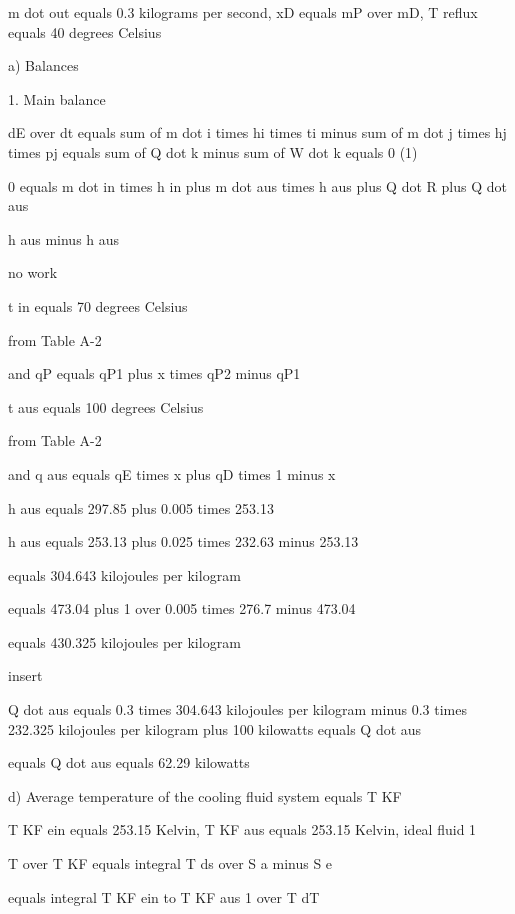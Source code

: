 m dot out equals 0.3 kilograms per second, xD equals mP over mD, T reflux equals 40 degrees Celsius

a) Balances

1. Main balance

dE over dt equals sum of m dot i times hi times ti minus sum of m dot j times hj times pj equals sum of Q dot k minus sum of W dot k equals 0 (1)

0 equals m dot in times h in plus m dot aus times h aus plus Q dot R plus Q dot aus

h aus minus h aus

no work

t in equals 70 degrees Celsius

from Table A-2

and qP equals qP1 plus x times qP2 minus qP1

t aus equals 100 degrees Celsius

from Table A-2

and q aus equals qE times x plus qD times 1 minus x

h aus equals 297.85 plus 0.005 times 253.13

h aus equals 253.13 plus 0.025 times 232.63 minus 253.13

equals 304.643 kilojoules per kilogram

equals 473.04 plus 1 over 0.005 times 276.7 minus 473.04

equals 430.325 kilojoules per kilogram

insert

Q dot aus equals 0.3 times 304.643 kilojoules per kilogram minus 0.3 times 232.325 kilojoules per kilogram plus 100 kilowatts equals Q dot aus

equals Q dot aus equals 62.29 kilowatts

d) Average temperature of the cooling fluid system equals T KF

T KF ein equals 253.15 Kelvin, T KF aus equals 253.15 Kelvin, ideal fluid 1

T over T KF equals integral T ds over S a minus S e

equals integral T KF ein to T KF aus 1 over T dT